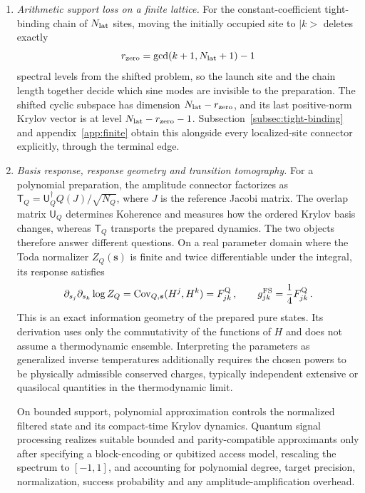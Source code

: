 \documentclass[a4paper,11pt]{article}
\def\ket#1{|#1>}%
\def\Jac{J}%
\theoremstyle{definition}
\theoremstyle{remark}
\newcommand{\ket}[1]{|#1\rangle}
\newcommand{\Jac}{\mathsf J}
\begin{document}
\begin{enumerate}[label=\emph{(\roman*)},leftmargin=2.2em,itemsep=4pt,topsep=4pt,parsep=0pt]
\item \emph{Arithmetic support loss on a finite lattice.}
 For the
constant-coefficient tight-binding chain of $N_{\rm lat}$ sites, moving the initially occupied site
to $\ket k$ deletes exactly
\begin{equation}
   r_{\rm zero}=\gcd(k+1,N_{\rm lat}+1)-1
   \label{eq:intro-gcd-support-loss}
\end{equation}
spectral levels from the shifted problem, so the launch site and the chain length together decide
which sine modes are invisible to the preparation.
 The shifted cyclic subspace has dimension
$N_{\rm lat}-r_{\rm zero}$, and its last positive-norm Krylov vector is at level
$N_{\rm lat}-r_{\rm zero}-1$. Subsection~\ref{subsec:tight-binding} and appendix~\ref{app:finite} obtain
this alongside every localized-site connector explicitly, through the terminal edge.

\item \emph{Basis response, response geometry and transition tomography.}
For a polynomial preparation, the amplitude connector factorizes as
$\mathsf T_Q=\mathsf U_Q^\dagger Q(\Jac)/\sqrt{N_Q}$, where $\Jac$ is the reference Jacobi matrix.  The overlap matrix $\mathsf U_Q$
determines Koherence and measures how the ordered Krylov basis changes, whereas $\mathsf T_Q$
transports the prepared dynamics.  The two objects therefore answer different questions.  On a
real parameter domain where the Toda normalizer $Z_Q(\boldsymbol s)$ is finite and twice differentiable under the integral, its response
satisfies
\begin{equation}
   \partial_{s_j}\partial_{s_k}\log Z_Q
   =\operatorname{Cov}_{Q,\boldsymbol s}(H^j,H^k)
   =F^{\rm Q}_{jk}\,,
   \qquad
   g^{\rm FS}_{jk}=\frac14F^{\rm Q}_{jk}\,.
\end{equation}
This is an exact information geometry of the prepared pure states.  Its derivation uses only the commutativity of the functions of $H$ and does not assume a thermodynamic ensemble.  Interpreting the parameters as generalized inverse temperatures
additionally requires the chosen powers to be physically admissible conserved charges, typically
independent extensive or quasilocal quantities in the thermodynamic limit.

On bounded support, polynomial approximation controls the normalized filtered state and its
compact-time Krylov dynamics.  Quantum signal processing realizes suitable bounded and
parity-compatible approximants only after specifying a block-encoding or qubitized access model,
rescaling the spectrum to $[-1,1]$, and accounting for polynomial degree, target precision,
normalization, success probability and any amplitude-amplification overhead.


\end{enumerate}
\end{document}
